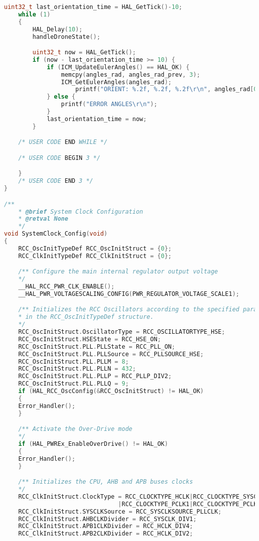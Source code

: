 \begin{lstlisting}[language=C++]
    uint32_t last_orientation_time = HAL_GetTick()-10;
    while (1)
    {
        HAL_Delay(10);
        handleDroneState();

        uint32_t now = HAL_GetTick();
        if (now - last_orientation_time >= 10) {
            if (ICM_UpdateEulerAngles() == HAL_OK) {
                memcpy(angles_rad, angles_rad_prev, 3);
                ICM_GetEulerAngles(angles_rad);
                    printf("ORIENT: %.2f, %.2f, %.2f\r\n", angles_rad[0], angles_rad[1], angles_rad[2]);
            } else {
                printf("ERROR ANGLES\r\n");
            }
            last_orientation_time = now;
        }

    /* USER CODE END WHILE */

    /* USER CODE BEGIN 3 */

    }
    /* USER CODE END 3 */
}

/**
    * @brief System Clock Configuration
    * @retval None
    */
void SystemClock_Config(void)
{
    RCC_OscInitTypeDef RCC_OscInitStruct = {0};
    RCC_ClkInitTypeDef RCC_ClkInitStruct = {0};

    /** Configure the main internal regulator output voltage
    */
    __HAL_RCC_PWR_CLK_ENABLE();
    __HAL_PWR_VOLTAGESCALING_CONFIG(PWR_REGULATOR_VOLTAGE_SCALE1);

    /** Initializes the RCC Oscillators according to the specified parameters
    * in the RCC_OscInitTypeDef structure.
    */
    RCC_OscInitStruct.OscillatorType = RCC_OSCILLATORTYPE_HSE;
    RCC_OscInitStruct.HSEState = RCC_HSE_ON;
    RCC_OscInitStruct.PLL.PLLState = RCC_PLL_ON;
    RCC_OscInitStruct.PLL.PLLSource = RCC_PLLSOURCE_HSE;
    RCC_OscInitStruct.PLL.PLLM = 8;
    RCC_OscInitStruct.PLL.PLLN = 432;
    RCC_OscInitStruct.PLL.PLLP = RCC_PLLP_DIV2;
    RCC_OscInitStruct.PLL.PLLQ = 9;
    if (HAL_RCC_OscConfig(&RCC_OscInitStruct) != HAL_OK)
    {
    Error_Handler();
    }

    /** Activate the Over-Drive mode
    */
    if (HAL_PWREx_EnableOverDrive() != HAL_OK)
    {
    Error_Handler();
    }

    /** Initializes the CPU, AHB and APB buses clocks
    */
    RCC_ClkInitStruct.ClockType = RCC_CLOCKTYPE_HCLK|RCC_CLOCKTYPE_SYSCLK
                                |RCC_CLOCKTYPE_PCLK1|RCC_CLOCKTYPE_PCLK2;
    RCC_ClkInitStruct.SYSCLKSource = RCC_SYSCLKSOURCE_PLLCLK;
    RCC_ClkInitStruct.AHBCLKDivider = RCC_SYSCLK_DIV1;
    RCC_ClkInitStruct.APB1CLKDivider = RCC_HCLK_DIV4;
    RCC_ClkInitStruct.APB2CLKDivider = RCC_HCLK_DIV2;


\end{lstlisting}
